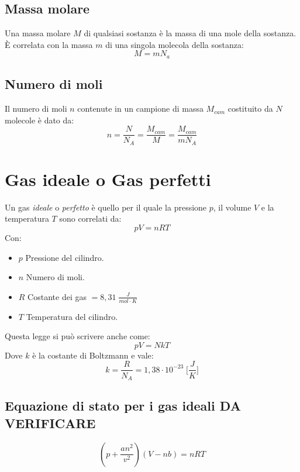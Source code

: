         \subsection{Massa molare} Una massa molare $M$ di qualsiasi sostanza è
        la massa di una mole della sostanza. È correlata con la massa $m$ di 
        una singola molecola della sostanza:
            \begin{equation}
                M = mN_a
            \end{equation}
        
        \subsection{Numero di moli} Il numero di moli $n$ contenute in un 
        campione di massa $M_{cam}$ costituito da $N$ molecole è dato da:
            \begin{equation}
                n = \frac{N}{N_A} = \frac{M_{cam}}{M} = \frac{M_{cam}}{mN_A}
            \end{equation}

    \section{Gas ideale o Gas perfetti} Un gas \textit{ideale} o \textit{
        perfetto} è quello per il quale la pressione $p$, il volume $V$ e la 
        temperatura $T$ sono correlati da:
        \begin{equation}
            pV = nRT
        \end{equation}
    Con:
        \begin{itemize}
            \item $p$ Pressione del cilindro.
            \item $n$ Numero di moli.
            \item $R$ Costante dei gas $= 8,31 \; \frac{J}{mol \cdot K}$
            \item $T$ Temperatura del cilindro.
        \end{itemize}
    Questa legge si può scrivere anche come:
        \begin{equation}
            pV = NkT
        \end{equation}
    Dove $k$ è la costante di Boltzmann e vale:
        \begin{equation*}
            k = \frac{R}{N_A} = 1,38 \cdot 10^{-23} \; \Bigg[\frac{J}{K}\Bigg]
        \end{equation*}
        \subsection{Equazione di stato per i gas ideali DA VERIFICARE}
            \begin{equation}
                (p + \frac{an^2}{v^2})(V - nb) = nRT
            \end{equation}

